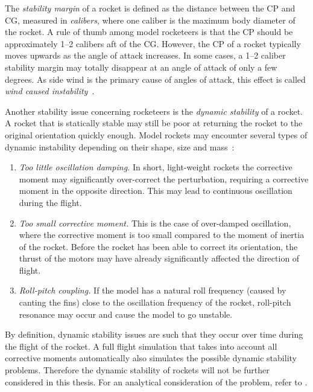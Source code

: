 The {\it stability margin} of a rocket is defined as the distance between
the CP and CG, measured in {\it calibers}, where one caliber is the
maximum body diameter of the rocket.  A rule of thumb among model
rocketeers is that the CP should be approximately 1--2 calibers aft of
the CG.  However, the CP of a rocket typically moves upwards as the
angle of attack increases.  In some cases, a 1--2 caliber stability
margin may totally disappear at an angle of attack of only a few
degrees.  As side wind is the primary cause of angles of attack, this
effect is called 
{\it wind caused instability}~\cite{galejs}.

Another stability issue concerning rocketeers is the
{\it dynamic stability} of a rocket.  A rocket that is statically
stable may still be poor at returning the rocket to the original
orientation quickly enough.  Model rockets may encounter several types of
dynamic instability depending on their shape, size and
mass~\cite[pp.~140--141]{stine}:
%
\begin{enumerate}
\item {\it Too little oscillation damping.}  In short, light-weight
  rockets the corrective moment may significantly over-correct the
  perturbation, requiring a corrective moment in the opposite
  direction.  This may lead to continuous oscillation during the
  flight.
\item {\it Too small corrective moment.}  This is the case of over-damped
  oscillation, where the corrective moment is too small compared to
  the moment of inertia of the rocket.  Before the rocket has been
  able to correct its orientation, the thrust of the motors may have
  already significantly affected the direction of flight.
\item {\it Roll-pitch coupling.}  If the model has a natural roll
  frequency (caused \eg by canting the fins) close to the oscillation
  frequency of the rocket, roll-pitch resonance may occur and cause
  the model to go unstable.
\end{enumerate}

By definition, dynamic stability issues are such that they occur over
time during the flight of the rocket.  A full flight simulation that
takes into account all corrective moments automatically also simulates
the possible dynamic stability problems.  Therefore the dynamic
stability of rockets will not be further considered in this
thesis. For an analytical consideration of the problem, refer to
\cite{advanced-model-rocketry}.



